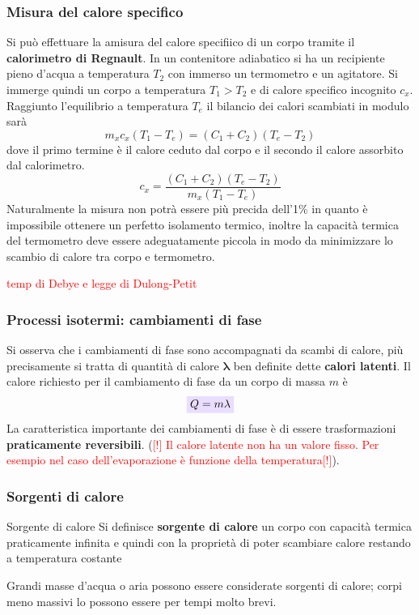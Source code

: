 \documentclass[x11names]{article}
\newcommand{\viola}[1]{\colorbox{yred}{$\displaystyle #1$}}
\begin{document}
	\subsubsection{Misura del calore specifico}
	Si può effettuare la amisura del calore specifiico di un corpo tramite il \textbf{calorimetro di Regnault}. In un contenitore adiabatico si ha un recipiente pieno d'acqua a temperatura \(T_2\) con immerso un termometro e un agitatore. Si immerge quindi un corpo a temperatura \(T_1 > T_2\) e di calore specifico incognito \(c_x\). Raggiunto l'equilibrio a temperatura \(T_e\) il bilancio dei calori scambiati in modulo sarà
	\[ 
	m_xc_x(T_1 - T_e) = (C_1 + C_2)(T_e - T_2)
	\]
	dove il primo termine è il calore ceduto dal corpo e il secondo il calore assorbito dal calorimetro.
	\[ 
	c_x = \frac{(C_1 + C_2)(T_e - T_2)}{m_x(T_1 - T_e)}
	\]
	Naturalmente la misura non potrà essere più precida dell'1\% in quanto è impossibile ottenere un perfetto isolamento termico, inoltre la capacità termica del termometro deve essere adeguatamente piccola  in modo da minimizzare lo scambio di calore tra corpo e termometro.
	
	
	\begin{center}
		\textcolor{red}{temp di Debye e legge di Dulong-Petit}
	\end{center}
	
	\subsubsection{Processi isotermi: cambiamenti di fase}
	Si osserva che i cambiamenti di fase sono accompagnati da scambi di calore, più precisamente si tratta di quantità di calore \(\boldsymbol{\lambda}\) ben definite dette  \textbf{calori latenti}. Il calore richiesto per il cambiamento di fase da un corpo di massa \(m\) è 
	\begin{equation}\label{calorelatente}
	\viola{	Q = m\lambda}
	\end{equation}
	La caratteristica importante dei cambiamenti di fase è di essere trasformazioni \textbf{praticamente reversibili}.
	(\textcolor{red}{[!] Il calore latente non ha un valore fisso. Per esempio nel caso dell'evaporazione è funzione della temperatura[!]}).
	
	\subsubsection{Sorgenti di calore}
	\begin{center}
		\colorbox{yblue}{\begin{minipage}{5.75in}
				\begin{blues}{Sorgente di calore}
					Si definisce \textbf{sorgente di calore} un corpo con capacità termica praticamente infinita e quindi con la proprietà di poter scambiare calore restando a temperatura costante
				\end{blues}
		\end{minipage}}
	\end{center}
	Grandi masse d'acqua o aria possono essere considerate sorgenti di calore; corpi meno massivi lo possono essere per tempi molto brevi.\\
	
\end{document}
